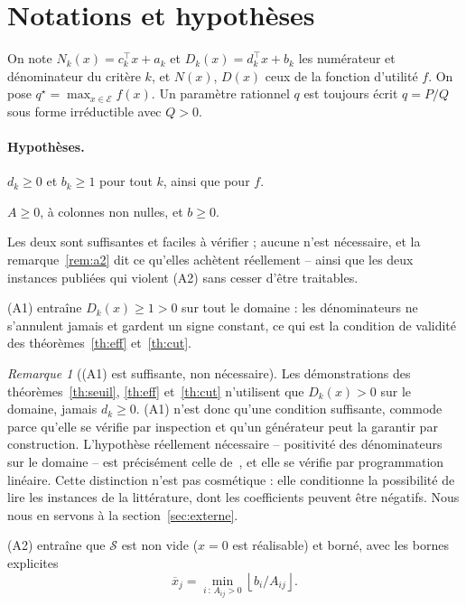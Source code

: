 \documentclass[11pt,a4paper]{article}
\theoremstyle{plain}
\theoremstyle{remark}
\newtheorem{remark}{Remarque}
\newcommand{\Nk}{N_k}
\newcommand{\Dk}{D_k}
\newcommand{\Ecal}{\mathcal{E}}
\newcommand{\Scal}{\mathcal{S}}
\newcommand{\qs}{q^{\star}}
\begin{document}
\section{Notations et hypothèses}

On note $\Nk(x)=c_k^{\!\top}x+a_k$ et $\Dk(x)=d_k^{\!\top}x+b_k$ les
numérateur et dénominateur du critère $k$, et $N(x)$, $D(x)$ ceux de la
fonction d'utilité $f$. On pose $\qs=\max_{x\in\Ecal}f(x)$. Un paramètre
rationnel $q$ est toujours écrit $q=P/Q$ sous forme irréductible avec $Q>0$.

\paragraph{Hypothèses.}
\begin{description}[leftmargin=1.4cm,style=nextline,itemsep=1pt]
\item[(A1)] $d_k\ge 0$ et $b_k\ge 1$ pour tout $k$, ainsi que pour $f$.
\item[(A2)] $A\ge 0$, à colonnes non nulles, et $b\ge 0$.
\end{description}

\noindent
Les deux sont suffisantes et faciles à vérifier ; aucune n'est nécessaire,
et la remarque~\ref{rem:a2} dit ce qu'elles achètent réellement -- ainsi
que les deux instances publiées qui violent (A2) sans cesser d'être
traitables.

\noindent
(A1) entraîne $\Dk(x)\ge 1>0$ sur tout le domaine : les dénominateurs ne
s'annulent jamais et gardent un signe constant, ce qui est la condition de
validité des théorèmes~\ref{th:eff} et~\ref{th:cut}.

\begin{remark}[(A1) est suffisante, non nécessaire]\label{rem:a1}
Les démonstrations des théorèmes~\ref{th:seuil}, \ref{th:eff}
et~\ref{th:cut} n'utilisent que $\Dk(x)>0$ sur le domaine, jamais
$d_k\ge 0$. (A1) n'est donc qu'une condition suffisante, commode parce
qu'elle se vérifie par inspection et qu'un générateur peut la garantir par
construction. L'hypothèse réellement nécessaire -- positivité des
dénominateurs sur le domaine -- est précisément celle
de~\cite{zerdani2011}, et elle se vérifie par programmation linéaire. Cette
distinction n'est pas cosmétique : elle conditionne la possibilité de lire
les instances de la littérature, dont les coefficients peuvent être
négatifs. Nous nous en servons à la section~\ref{sec:externe}.
\end{remark} (A2) entraîne que
$\Scal$ est non vide ($x=0$ est réalisable) et borné, avec les bornes
explicites
\[
  \overline{x}_j=\min_{i\,:\,A_{ij}>0}\left\lfloor b_i/A_{ij}\right\rfloor .
\]
\end{document}
